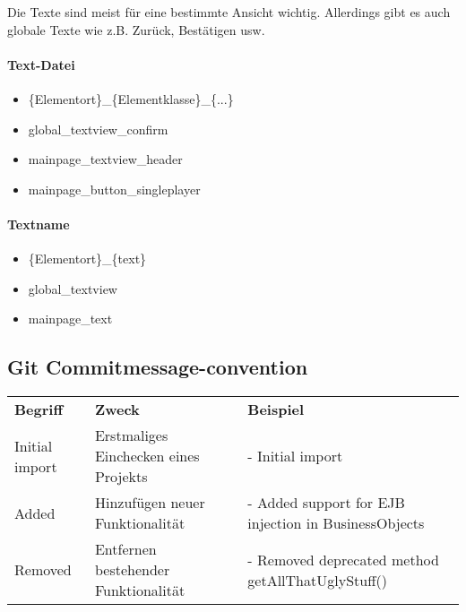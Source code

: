 Die Texte sind meist für eine bestimmte Ansicht wichtig. Allerdings gibt es auch globale Texte wie z.B. Zurück, Bestätigen usw.

\paragraph{Text-Datei}

\begin{itemize}
	\item \{Elementort\}\_\{Elementklasse\}\_\{...\}
\end{itemize}

\begin{itemize}
\item global\_textview\_confirm
\item mainpage\_textview\_header 
\item mainpage\_button\_singleplayer 
\end{itemize}

\paragraph{Textname}

\begin{itemize}
	\item \{Elementort\}\_\{text\}
\end{itemize} 

\begin{itemize}
	\item global\_textview
	\item mainpage\_text
\end{itemize}

\subsection{Git Commitmessage-convention}

\begin{table}[H]
\begin{tabular}{|l|p{5cm}|p{9cm}|}
\hline
\textbf{Begriff} & \textbf{Zweck} & \textbf{Beispiel} \\
Initial import & Erstmaliges Einchecken eines Projekts & - Initial import \\
\hline
Added          & Hinzufügen neuer Funktionalität &  - Added support for 
														EJB injection in BusinessObjects\\
\hline
Removed        & Entfernen bestehender Funktionalität & - Removed 
														deprecated method 
														getAllThatUglyStuff() \\
\hline
\end{tabular}
\end{table}

